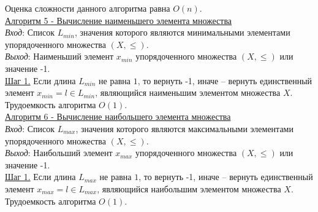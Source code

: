 \documentclass[bachelor, och, labwork]{shiza}
\begin{document}
            Оценка сложности данного алгоритма равна $O(n)$.\\

            

        \underline{Алгоритм 5 - Вычисление наименьшего элемента множества}\\
            \textit{Вход}: Список $L_{min}$, значения которого являются минимальными элементами упорядоченного множества $(X, \leq)$.\\
            \textit{Выход}: Наименьший элемент $x_{min}$ упорядоченного множества $(X, \leq)$ или значение -1.\\
            \underline{Шаг 1.} Если длина $L_{min}$ не равна $1$, то вернуть -1, иначе -- вернуть единственный элемент $x_{min} = l \in L_{min}$,
            являющийся наименьшим элементом множества $X$.\\
                
            Трудоемкость алгоритма $O(1)$.\\

        \underline{Алгоритм 6 - Вычисление наибольшего элемента множества}\\
            \textit{Вход}: Список $L_{max}$, значения которого являются максимальными элементами упорядоченного множества $(X, \leq)$.\\
            \textit{Выход}: Наибольший элемент $x_{max}$ упорядоченного множества $(X, \leq)$ или значение -1.\\
            \underline{Шаг 1.} Если длина $L_{max}$ не равна $1$, то вернуть -1, иначе -- вернуть единственный элемент
            $x_{max} = l \in L_{max}$, являющийся наибольшим элементом множества $X$.\\
                
            Трудоемкость алгоритма $O(1)$.\\
\end{document}
